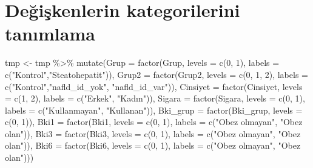 \documentclass[
]{article}
\newenvironment{Shaded}{\begin{snugshade}}{\end{snugshade}}
\newcommand{\AttributeTok}[1]{\textcolor[rgb]{0.77,0.63,0.00}{#1}}
\newcommand{\DecValTok}[1]{\textcolor[rgb]{0.00,0.00,0.81}{#1}}
\newcommand{\FunctionTok}[1]{\textcolor[rgb]{0.00,0.00,0.00}{#1}}
\newcommand{\NormalTok}[1]{#1}
\newcommand{\OtherTok}[1]{\textcolor[rgb]{0.56,0.35,0.01}{#1}}
\newcommand{\SpecialCharTok}[1]{\textcolor[rgb]{0.00,0.00,0.00}{#1}}
\newcommand{\StringTok}[1]{\textcolor[rgb]{0.31,0.60,0.02}{#1}}
\begin{document}
\hypertarget{deux11fiux15fkenlerin-kategorilerini-tanux131mlama}{%
\section{Değişkenlerin kategorilerini
tanımlama}\label{deux11fiux15fkenlerin-kategorilerini-tanux131mlama}}

\par\medskip

\begin{Shaded}
\begin{Highlighting}[]
\NormalTok{tmp }\OtherTok{\textless{}{-}}\NormalTok{ tmp }\SpecialCharTok{\%\textgreater{}\%}
\FunctionTok{mutate}\NormalTok{(}\AttributeTok{Grup =} \FunctionTok{factor}\NormalTok{(Grup, }\AttributeTok{levels =} \FunctionTok{c}\NormalTok{(}\DecValTok{0}\NormalTok{, }\DecValTok{1}\NormalTok{), }\AttributeTok{labels =} \FunctionTok{c}\NormalTok{(}\StringTok{"Kontrol"}\NormalTok{,}\StringTok{"Steatohepatit"}\NormalTok{)),}
       \AttributeTok{Grup2 =} \FunctionTok{factor}\NormalTok{(Grup2, }\AttributeTok{levels =} \FunctionTok{c}\NormalTok{(}\DecValTok{0}\NormalTok{, }\DecValTok{1}\NormalTok{, }\DecValTok{2}\NormalTok{), }\AttributeTok{labels =} \FunctionTok{c}\NormalTok{(}\StringTok{"Kontrol"}\NormalTok{,}\StringTok{"nafld\_id\_yok"}\NormalTok{, }\StringTok{"nafld\_id\_var"}\NormalTok{)),}
       \AttributeTok{Cinsiyet =} \FunctionTok{factor}\NormalTok{(Cinsiyet, }\AttributeTok{levels =} \FunctionTok{c}\NormalTok{(}\DecValTok{1}\NormalTok{, }\DecValTok{2}\NormalTok{), }\AttributeTok{labels =} \FunctionTok{c}\NormalTok{(}\StringTok{"Erkek"}\NormalTok{, }\StringTok{"Kadın"}\NormalTok{)), }
       \AttributeTok{Sigara =} \FunctionTok{factor}\NormalTok{(Sigara, }\AttributeTok{levels =} \FunctionTok{c}\NormalTok{(}\DecValTok{0}\NormalTok{, }\DecValTok{1}\NormalTok{), }\AttributeTok{labels =} \FunctionTok{c}\NormalTok{(}\StringTok{"Kullanmayan"}\NormalTok{, }\StringTok{"Kullanan"}\NormalTok{)),}
       \AttributeTok{Bki\_grup =} \FunctionTok{factor}\NormalTok{(Bki\_grup, }\AttributeTok{levels =} \FunctionTok{c}\NormalTok{(}\DecValTok{0}\NormalTok{, }\DecValTok{1}\NormalTok{)),}
       \AttributeTok{Bki1 =} \FunctionTok{factor}\NormalTok{(Bki1, }\AttributeTok{levels =} \FunctionTok{c}\NormalTok{(}\DecValTok{0}\NormalTok{, }\DecValTok{1}\NormalTok{), }\AttributeTok{labels =} \FunctionTok{c}\NormalTok{(}\StringTok{"Obez olmayan"}\NormalTok{, }\StringTok{"Obez olan"}\NormalTok{)),}
       \AttributeTok{Bki3 =} \FunctionTok{factor}\NormalTok{(Bki3, }\AttributeTok{levels =} \FunctionTok{c}\NormalTok{(}\DecValTok{0}\NormalTok{, }\DecValTok{1}\NormalTok{), }\AttributeTok{labels =} \FunctionTok{c}\NormalTok{(}\StringTok{"Obez olmayan"}\NormalTok{, }\StringTok{"Obez olan"}\NormalTok{)),}
       \AttributeTok{Bki6 =} \FunctionTok{factor}\NormalTok{(Bki6, }\AttributeTok{levels =} \FunctionTok{c}\NormalTok{(}\DecValTok{0}\NormalTok{, }\DecValTok{1}\NormalTok{), }\AttributeTok{labels =} \FunctionTok{c}\NormalTok{(}\StringTok{"Obez olmayan"}\NormalTok{, }\StringTok{"Obez olan"}\NormalTok{)))}
\end{Highlighting}
\end{Shaded}
\end{document}
